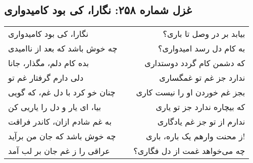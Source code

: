 \begin{center}
\section*{غزل شماره ۲۵۸: نگارا، کی بود کامیدواری}
\label{sec:258}
\begin{longtable}{l p{0.5cm} r}
نگارا، کی بود کامیدواری
&&
بیابد بر در وصل تا باری؟
\\
چه خوش باشد که بعد از ناامیدی
&&
به کام دل رسد امیدواری؟
\\
بده کام دلم، مگذار، جانا
&&
که دشمن کام گردد دوستداری
\\
دلی دارم گرفتار غم تو
&&
ندارد جز غم تو غمگساری
\\
چنان خو کرد با دل غم، که گویی
&&
بجز غم خوردن او را نیست کاری
\\
بیا، ای یار و دل را یاریی کن
&&
که بیچاره ندارد جز تو یاری
\\
به غم شادم ازان، کاندر فراقت
&&
ندارم از تو جز غم یادگاری
\\
چه خوش باشد که جان من برآید
&&
ز محنت وارهم یک باره، باری!
\\
عراقی را ز غم جان بر لب آمد
&&
چه می‌خواهد غمت از دل فگاری؟
\\
\end{longtable}
\end{center}
